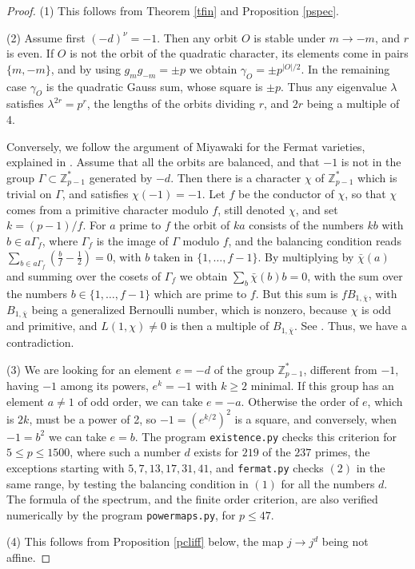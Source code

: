 \documentclass[11pt]{amsart}
\theoremstyle{definition}
\begin{document}
\begin{proof}
(1) This follows from Theorem \ref{tfin} and Proposition \ref{pspec}.

\medskip

(2) Assume first $(-d)^\nu=-1$. Then any orbit $O$ is stable under $m\to-m$, and $r$ is even. If $O$ is not the orbit of the quadratic character, its elements come in pairs $\{m,-m\}$, and by using $g_mg_{-m}=\pm p$ we obtain $\gamma_O=\pm p^{|O|/2}$. In the remaining case $\gamma_O$ is the quadratic Gauss sum, whose square is $\pm p$. Thus any eigenvalue $\lambda$ satisfies $\lambda^{2r}=p^r$, the lengths of the orbits dividing $r$, and $2r$ being a multiple of 4.

\medskip

Conversely, we follow the argument of Miyawaki for the Fermat varieties, explained in \cite{ska}. Assume that all the orbits are balanced, and that $-1$ is not in the group $\Gamma\subset\mathbb Z_{p-1}^*$ generated by $-d$. Then there is a character $\chi$ of $\mathbb Z_{p-1}^*$ which is trivial on $\Gamma$, and satisfies $\chi(-1)=-1$. Let $f$ be the conductor of $\chi$, so that $\chi$ comes from a primitive character modulo $f$, still denoted $\chi$, and set $k=(p-1)/f$. For $a$ prime to $f$ the orbit of $ka$ consists of the numbers $kb$ with $b\in a\Gamma_f$, where $\Gamma_f$ is the image of $\Gamma$ modulo $f$, and the balancing condition reads $\sum_{b\in a\Gamma_f}(\frac{b}{f}-\frac{1}{2})=0$, with $b$ taken in $\{1,\ldots,f-1\}$. By multiplying by $\bar{\chi}(a)$ and summing over the cosets of $\Gamma_f$ we obtain $\sum_b\bar{\chi}(b)b=0$, with the sum over the numbers $b\in\{1,\ldots,f-1\}$ which are prime to $f$. But this sum is $fB_{1,\bar{\chi}}$, with $B_{1,\bar{\chi}}$ being a generalized Bernoulli number, which is nonzero, because $\chi$ is odd and primitive, and $L(1,\chi)\neq0$ is then a multiple of $B_{1,\bar{\chi}}$. See \cite{was}. Thus, we have a contradiction.

\medskip

(3) We are looking for an element $e=-d$ of the group $\mathbb Z_{p-1}^*$, different from $-1$, having $-1$ among its powers, $e^k=-1$ with $k\geq2$ minimal. If this group has an element $a\neq1$ of odd order, we can take $e=-a$. Otherwise the order of $e$, which is $2k$, must be a power of 2, so $-1=(e^{k/2})^2$ is a square, and conversely, when $-1=b^2$ we can take $e=b$. The program \texttt{existence.py} checks this criterion for $5\leq p\leq1500$, where such a number $d$ exists for $219$ of the $237$ primes, the exceptions starting with $5,7,13,17,31,41$, and \texttt{fermat.py} checks $(2)$ in the same range, by testing the balancing condition in $(1)$ for all the numbers $d$. The formula of the spectrum, and the finite order criterion, are also verified numerically by the program \texttt{powermaps.py}, for $p\leq47$.

\medskip

(4) This follows from Proposition \ref{pcliff} below, the map $j\to j^d$ being not affine.
\end{proof}
\end{document}
